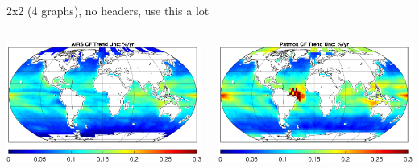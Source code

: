 \documentclass[10pt,t]{beamer}
\begin{document}
\begin{frame}[label={sec:org3c4166f}]{2x2 (4 graphs), no headers, use this a lot}
\vspace{-0.5in}
\begin{columns}
\begin{column}{0.55\columnwidth}
\begin{block}{}
\begin{center}
\includegraphics[width=\linewidth]{./Figs/airs_percent_trend_unc.png}
\end{center}
\end{block}
\end{column}

\begin{column}{0.55\columnwidth}
\begin{block}{}
\begin{center}
\includegraphics[width=\linewidth]{./Figs/patmos_percent_trend_unc.png}
\end{center}
\end{block}
\end{column}
\end{columns}


\end{frame}
\end{document}
